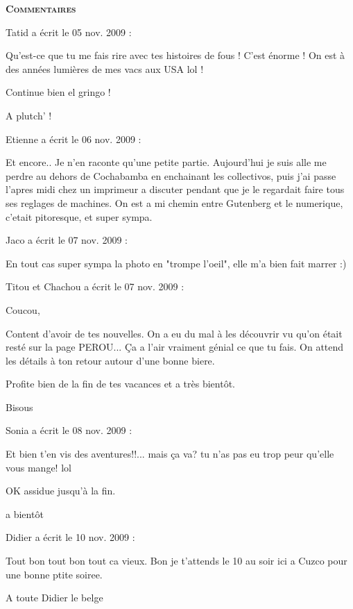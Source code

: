 \bigskip
\textbf{\textsc{Commentaires}}

\medskip
Tatid a écrit le 05 nov. 2009 :
\begin{displayquote}
Qu'est-ce que tu me fais rire avec tes histoires de fous ! C'est énorme ! On est à des années lumières de mes vacs aux USA lol !

Continue bien el gringo !

A plutch' !
\end{displayquote}

\medskip
Etienne a écrit le 06 nov. 2009 :
\begin{displayquote}
Et encore.. Je n'en raconte qu'une petite partie. Aujourd'hui je suis alle me perdre au dehors de Cochabamba en enchainant les collectivos, puis j'ai passe l'apres midi chez un imprimeur a discuter pendant que je le regardait faire tous ses reglages de machines. On est a mi chemin entre Gutenberg et le numerique, c'etait pitoresque, et super sympa.
\end{displayquote}

\medskip
Jaco a écrit le 07 nov. 2009 :
\begin{displayquote}
En tout cas super sympa la photo en "trompe l'oeil", elle m'a bien fait marrer :)
\end{displayquote}

\medskip
Titou et Chachou a écrit le 07 nov. 2009 :
\begin{displayquote}
Coucou,

Content d'avoir de tes nouvelles. On a eu du mal à les découvrir vu qu'on était resté sur la page PEROU... Ça a l'air vraiment génial ce que tu fais. On attend les détails à ton retour autour d'une bonne biere.

Profite bien de la fin de tes vacances et a très bientôt.

Bisous
\end{displayquote}

\medskip
Sonia a écrit le 08 nov. 2009 :
\begin{displayquote}
Et bien t'en vis des aventures!!... mais ça va? tu n'as pas eu trop peur qu'elle vous mange! lol

OK assidue jusqu'à la fin.

a bientôt
\end{displayquote}

\medskip
Didier a écrit le 10 nov. 2009 :
\begin{displayquote}
Tout bon tout bon tout ca vieux. Bon je t'attends le 10 au soir ici a Cuzco pour une bonne ptite soiree.

A toute
Didier le belge
\end{displayquote}

